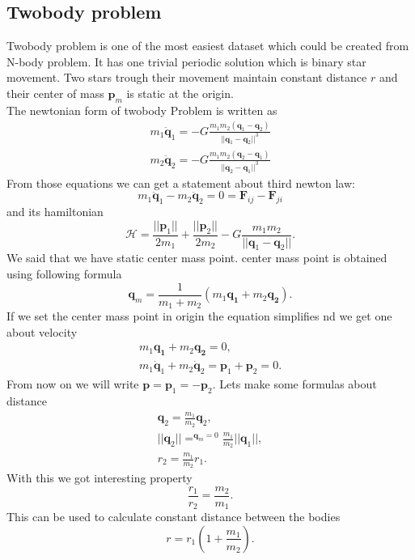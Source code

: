 \subsection{Twobody problem}
Twobody problem is one of the most easiest dataset which could be created from N-body problem. It has one trivial periodic solution which is binary star movement.
Two stars trough their movement maintain constant distance $r$ and their center of mass $\mathbf{p}_m$ is static at the origin.\\
The newtonian form of twobody Problem is written as
\begin{eqnarray}
	m_1\ddot{\mathbf{q}}_1 = -G\frac{m_1m_2(\mathbf{q}_1-\mathbf{q}_2)}{||\mathbf{q}_1-\mathbf{q}_2||^3}\\
	m_2\ddot{\mathbf{q}}_2 = -G\frac{m_1m_2(\mathbf{q}_2-\mathbf{q}_1)}{||\mathbf{q}_2-\mathbf{q}_1||^3}
\end{eqnarray}
From those equations we can get a statement about third newton law:
\begin{equation}
	m_1\ddot{\mathbf{q}}_1 -m_2\ddot{\mathbf{q}}_2 = 0 = \mathbf{F}_{ij} - \mathbf{F}_{ji}
\end{equation}
and its hamiltonian
\begin{equation}
\mathcal{H} = \frac{||\mathbf{p}_1||}{2m_1} +\frac{||\mathbf{p}_2||}{2m_2} - G\frac{m_1m_2}{||\mathbf{q}_1 - \mathbf{q}_2||}.
\end{equation}
We said that we have static center mass point. center mass point is obtained using following formula
\begin{equation}
	\mathbf{q}_m = \frac{1}{m_1+m_2}(m_1\mathbf{q_1} + m_2\mathbf{q_2}).
\end{equation}
If we set the center mass point in origin the equation simplifies nd we get one about velocity
\begin{eqnarray}
	m_1\mathbf{q_1} + m_2\mathbf{q_2} = 0,\\
	m_1\dot{\mathbf{q}}_1 + m_2\dot{\mathbf{q}}_2 = \mathbf{p}_1 +\mathbf{p}_2 = 0.
\end{eqnarray}
From now on we will write $\mathbf{p} =\mathbf{p}_1 = -\mathbf{p}_2$.
Lets make some formulas about distance
\begin{eqnarray}
	\mathbf{q}_2 = \frac{m_1}{m_2}\mathbf{q}_2,\\
	||\mathbf{q}_2|| =^{\mathbf{q}_m=0} \frac{m_1}{m_2}||\mathbf{q}_1||,\\ 
	r_2 =\frac{m_1}{m_2}r_1.
\end{eqnarray}
With this we got interesting property
\begin{equation}
	\frac{r_1}{r_2} =\frac{m_2}{m_1}. 
\end{equation}
This can be used to calculate constant distance between the bodies
\begin{equation}
	r=r_1\left(1 + \frac{m_1}{m_2}\right).
\end{equation}

